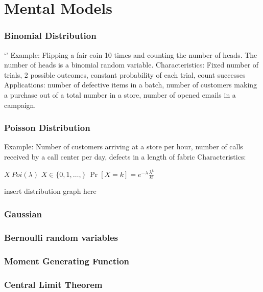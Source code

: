 \section*{Mental Models}
\subsubsection*{Binomial Distribution}`'
Example: Flipping a fair coin 10 times and counting the number of heads. The number of heads is a binomial random variable.
Characteristics: Fixed number of trials, 2 possible outcomes, constant probability of each trial, count successes
Applications: number of defective items in a batch, number of customers making a purchase out of a total number in a store, number of opened emails in a campaign.

\subsubsection*{Poisson Distribution}
Example: Number of customers arriving at a store per hour, number of calls received by a call center per day, defects in a length of fabric
Characteristics: 

$X ~ Poi(\lambda)$
$X \in \{0, 1, \dots, \}$
$\Pr[X = k] = e^{-\lambda} \frac{\lambda^k}{k!}$

insert distribution graph here

\subsubsection*{Gaussian}

\subsubsection*{Bernoulli random variables}

\subsubsection*{Moment Generating Function}

\subsubsection*{Central Limit Theorem}